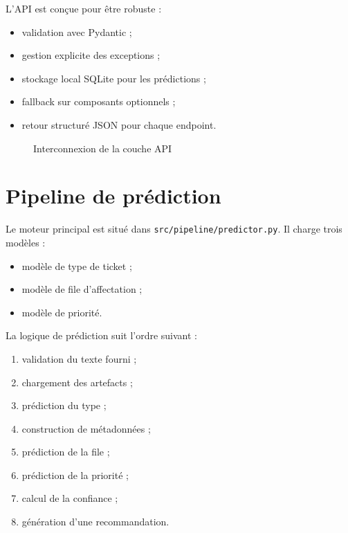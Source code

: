 \documentclass[11pt,a4paper]{report}
\begin{document}
L’API est conçue pour être robuste :
\begin{itemize}[leftmargin=1.3em]
    \item validation avec Pydantic ;
    \item gestion explicite des exceptions ;
    \item stockage local SQLite pour les prédictions ;
    \item fallback sur composants optionnels ;
    \item retour structuré JSON pour chaque endpoint.
\end{itemize}

\begin{figure}[H]
\centering
{}
\caption{Interconnexion de la couche API}
\end{figure}

\section{Pipeline de prédiction}
Le moteur principal est situé dans \texttt{src/pipeline/predictor.py}. Il charge trois modèles :
\begin{itemize}[leftmargin=1.3em]
    \item modèle de type de ticket ;
    \item modèle de file d’affectation ;
    \item modèle de priorité.
\end{itemize}
La logique de prédiction suit l’ordre suivant :
\begin{enumerate}[leftmargin=1.8em]
    \item validation du texte fourni ;
    \item chargement des artefacts ;
    \item prédiction du type ;
    \item construction de métadonnées ;
    \item prédiction de la file ;
    \item prédiction de la priorité ;
    \item calcul de la confiance ;
    \item génération d’une recommandation.
\end{enumerate}
\end{document}
